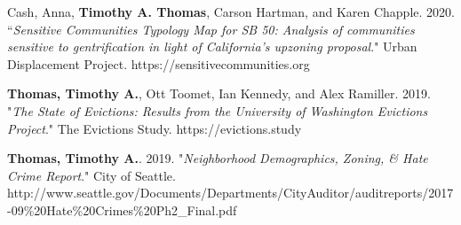 \begin{cvparagraph}

Cash, Anna, \textbf{Timothy A. Thomas}, Carson Hartman, and Karen Chapple. 2020. “\emph{Sensitive Communities Typology Map for SB 50: Analysis of communities sensitive to gentrification in light of California's upzoning proposal}." Urban Displacement Project. https://sensitivecommunities.org
\end{cvparagraph}

\begin{cvparagraph}

\textbf{Thomas, Timothy A.}, Ott Toomet, Ian Kennedy, and Alex Ramiller. 2019. "\emph{The State of Evictions: Results from the University of Washington Evictions Project}." The Evictions Study. https://evictions.study
\end{cvparagraph}

\begin{cvparagraph}

\textbf{Thomas, Timothy A.}. 2019. "\emph{Neighborhood Demographics, Zoning, & Hate Crime Report}." City of Seattle. http://www.seattle.gov/Documents/Departments\newline/CityAuditor/auditreports/2017-09\%20Hate\%20Crimes\%20Ph2\_Final.pdf
\end{cvparagraph}